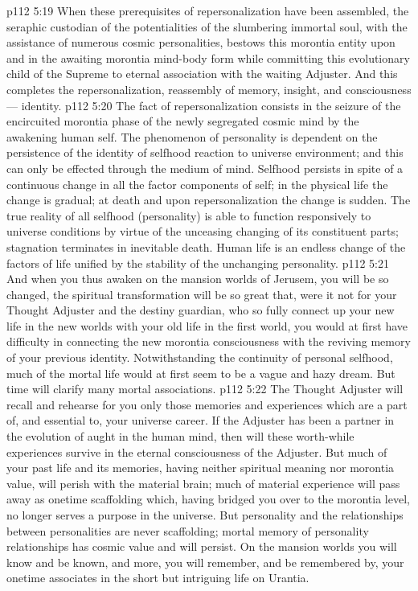 \vs p112 5:19 \bibnobreakspace When these prerequisites of repersonalization have been assembled, the seraphic custodian of the potentialities of the slumbering immortal soul, with the assistance of numerous cosmic personalities, bestows this morontia entity upon and in the awaiting morontia mind\hyp{}body form while committing this evolutionary child of the Supreme to eternal association with the waiting Adjuster. And this completes the repersonalization, reassembly of memory, insight, and consciousness --- identity.
\vs p112 5:20 \pc The fact of repersonalization consists in the seizure of the encircuited morontia phase of the newly segregated cosmic mind by the awakening human self. The phenomenon of personality is dependent on the persistence of the identity of selfhood reaction to universe environment; and this can only be effected through the medium of mind. Selfhood persists in spite of a continuous change in all the factor components of self; in the physical life the change is gradual; at death and upon repersonalization the change is sudden. The true reality of all selfhood (personality) is able to function responsively to universe conditions by virtue of the unceasing changing of its constituent parts; stagnation terminates in inevitable death. Human life is an endless change of the factors of life unified by the stability of the unchanging personality.
\vs p112 5:21 And when you thus awaken on the mansion worlds of Jerusem, you will be so changed, the spiritual transformation will be so great that, were it not for your Thought Adjuster and the destiny guardian, who so fully connect up your new life in the new worlds with your old life in the first world, you would at first have difficulty in connecting the new morontia consciousness with the reviving memory of your previous identity. Notwithstanding the continuity of personal selfhood, much of the mortal life would at first seem to be a vague and hazy dream. But time will clarify many mortal associations.
\vs p112 5:22 The Thought Adjuster will recall and rehearse for you only those memories and experiences which are a part of, and essential to, your universe career. If the Adjuster has been a partner in the evolution of aught in the human mind, then will these worth\hyp{}while experiences survive in the eternal consciousness of the Adjuster. But much of your past life and its memories, having neither spiritual meaning nor morontia value, will perish with the material brain; much of material experience will pass away as onetime scaffolding which, having bridged you over to the morontia level, no longer serves a purpose in the universe. But personality and the relationships between personalities are never scaffolding; mortal memory of personality relationships has cosmic value and will persist. On the mansion worlds you will know and be known, and more, you will remember, and be remembered by, your onetime associates in the short but intriguing life on Urantia.
